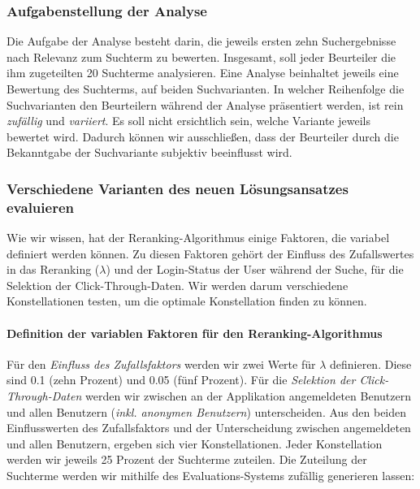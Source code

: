 \subsubsection{Aufgabenstellung der Analyse}
\label{sec:Evaluation:Aufbau:Durchfuehrung:Aufgabenstellung}

Die Aufgabe der Analyse besteht darin, die jeweils ersten zehn Suchergebnisse nach Relevanz zum Suchterm zu bewerten. Insgesamt, soll jeder Beurteiler die ihm zugeteilten 20 Suchterme analysieren. Eine Analyse beinhaltet jeweils eine Bewertung des Suchterms, auf beiden Suchvarianten. In welcher Reihenfolge die Suchvarianten den Beurteilern während der Analyse präsentiert werden, ist rein \textit{zufällig} und \textit{variiert}. Es soll nicht ersichtlich sein, welche Variante jeweils bewertet wird. Dadurch können wir ausschließen, dass der Beurteiler durch die Bekanntgabe der Suchvariante subjektiv beeinflusst wird. 

\subsubsection{Verschiedene Varianten des neuen Lösungsansatzes evaluieren}
\label{sec:Evaluation:Aufbau:Durchfuehrung:EvaluationsdatenVarianteLoesungsansatzes}

Wie wir wissen, hat der Reranking-Algorithmus einige Faktoren, die variabel definiert werden können. Zu diesen Faktoren gehört der Einfluss des Zufallswertes in das Reranking ($\lambda$) und der \glqq Login-Status der User\grqq{} während der Suche, für die Selektion der Click-Through-Daten. Wir werden darum verschiedene Konstellationen testen, um die optimale Konstellation finden zu können. 

\paragraph{Definition der variablen Faktoren für den Reranking-Algorithmus}
Für den \textit{Einfluss des Zufallsfaktors} werden wir zwei Werte für $\lambda$ definieren. Diese sind 0.1 (zehn Prozent) und 0.05 (fünf Prozent). Für die \textit{Selektion der Click-Through-Daten} werden wir zwischen an der Applikation angemeldeten Benutzern und allen Benutzern (\textit{inkl. anonymen Benutzern}) unterscheiden. Aus den beiden Einflusswerten des Zufallsfaktors und der Unterscheidung zwischen angemeldeten und allen Benutzern, ergeben sich vier Konstellationen. Jeder Konstellation werden wir jeweils 25 Prozent der Suchterme zuteilen. Die Zuteilung der Suchterme werden wir mithilfe des Evaluations-Systems zufällig generieren lassen:

